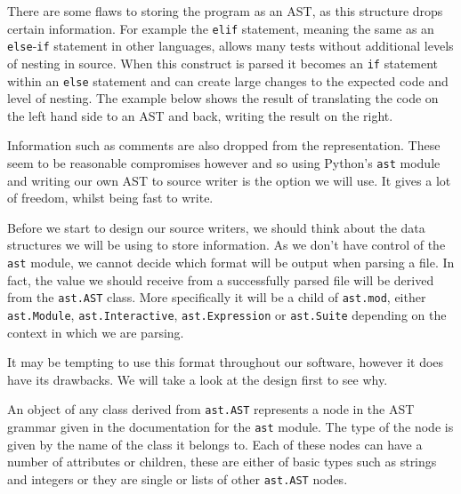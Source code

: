 \documentclass[twoside,a4paper]{report}
\begin{document}
There are some flaws to storing the program as an AST, as this structure drops certain information.
For example the \texttt{elif} statement, meaning the same as an \texttt{else}-\texttt{if} statement in other languages, allows many tests without
additional levels of nesting in source. When this construct is parsed it becomes an \texttt{if} statement within an \texttt{else} statement and
can create large changes to the expected code and level of nesting. The example below shows the result of translating the code on the left hand
side to an AST and back, writing the result on the right.

\begin{minipage}[b]{0.4\linewidth}
\centering

\end{minipage}
\hspace{1cm}
\begin{minipage}[b]{0.5\linewidth}
\centering

\end{minipage}

Information such as comments are also dropped from the representation. These seem to be reasonable compromises however and so
using Python's \texttt{ast} module and writing our own AST to source writer is the option we will use. It gives a lot of freedom, whilst
being fast to write.

Before we start to design our source writers, we should think about the data structures we will be using to store information. As we don't have
control of the \texttt{ast} module, we cannot decide which format will be output when parsing a file. In fact, the value we should receive from
a successfully parsed file will be derived from the \texttt{ast.AST} class. More specifically it will be a child of \texttt{ast.mod}, either
\texttt{ast.Module}, \texttt{ast.Interactive}, \texttt{ast.Expression} or \texttt{ast.Suite} depending on the context in which we are parsing.

It may be tempting to use this format throughout our software, however it does have its drawbacks. We will take a look at the design first to see why.

An object of any class derived from \texttt{ast.AST} represents a node in the AST grammar given in the documentation for the \texttt{ast} module. The
type of the node is given by the name of the class it belongs to. Each of these nodes can have a number of attributes or children, these are either of basic
types such as strings and integers or they are single or lists of other \texttt{ast.AST} nodes.
\end{document}
